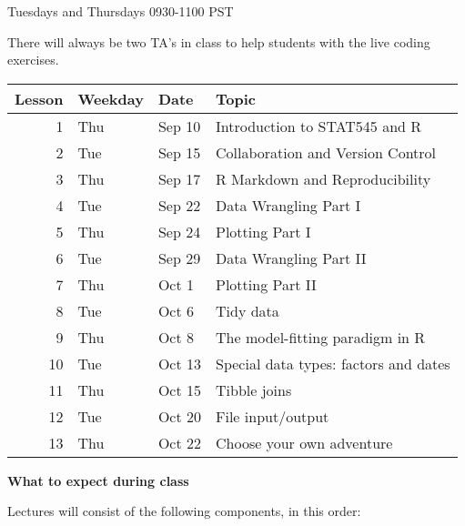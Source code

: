 \documentclass[
]{article}
\begin{document}
Tuesdays and Thursdays 0930-1100 PST

There will always be two TA's in class to help students with the live
coding exercises.

\begin{longtable}[]{@{}rlll@{}}
\toprule
Lesson & Weekday & Date & Topic\tabularnewline
\midrule
\endhead
1 & Thu & Sep 10 & Introduction to STAT545 and R\tabularnewline
2 & Tue & Sep 15 & Collaboration and Version Control\tabularnewline
3 & Thu & Sep 17 & R Markdown and Reproducibility\tabularnewline
4 & Tue & Sep 22 & Data Wrangling Part I\tabularnewline
5 & Thu & Sep 24 & Plotting Part I\tabularnewline
6 & Tue & Sep 29 & Data Wrangling Part II\tabularnewline
7 & Thu & Oct 1 & Plotting Part II\tabularnewline
8 & Tue & Oct 6 & Tidy data\tabularnewline
9 & Thu & Oct 8 & The model-fitting paradigm in R\tabularnewline
10 & Tue & Oct 13 & Special data types: factors and dates\tabularnewline
11 & Thu & Oct 15 & Tibble joins\tabularnewline
12 & Tue & Oct 20 & File input/output\tabularnewline
13 & Thu & Oct 22 & Choose your own adventure\tabularnewline
\bottomrule
\end{longtable}

\textbf{What to expect during class}

Lectures will consist of the following components, in this order:
\end{document}
